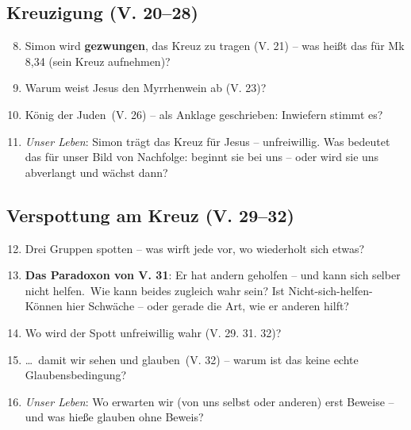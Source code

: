 \documentclass[12pt,a4paper]{article}
\begin{document}
\subsection*{Kreuzigung (V. 20--28)}
\begin{enumerate}\setcounter{enumi}{7}
  \item Simon wird \textbf{gezwungen}, das Kreuz zu tragen (V. 21) -- was heißt das für Mk 8,34 (\glqq sein Kreuz aufnehmen\grqq{})?
  \item Warum weist Jesus den Myrrhenwein ab (V. 23)?
  \item \glqq König der Juden\grqq\ (V. 26) -- als Anklage geschrieben: Inwiefern stimmt es?
  \item \emph{Unser Leben}: Simon trägt das Kreuz für Jesus -- unfreiwillig. Was bedeutet das für unser Bild von Nachfolge: beginnt sie bei uns -- oder wird sie uns abverlangt und wächst dann?
\end{enumerate}

\subsection*{Verspottung am Kreuz (V. 29--32)}
\begin{enumerate}\setcounter{enumi}{11}
  \item Drei Gruppen spotten -- was wirft jede vor, wo wiederholt sich etwas?
  \item \textbf{Das Paradoxon von V. 31}: \glqq Er hat andern geholfen -- und kann sich selber nicht helfen.\grqq\ Wie kann beides zugleich wahr sein? Ist Nicht-sich-helfen-Können hier Schwäche -- oder gerade die Art, wie er anderen hilft?
  \item Wo wird der Spott unfreiwillig wahr (V. 29. 31. 32)?
  \item \glqq \ldots\ damit wir sehen und glauben\grqq\ (V. 32) -- warum ist das keine echte Glaubensbedingung?
  \item \emph{Unser Leben}: Wo erwarten wir (von uns selbst oder anderen) erst Beweise -- und was hieße glauben ohne Beweis?
\end{enumerate}
\end{document}
